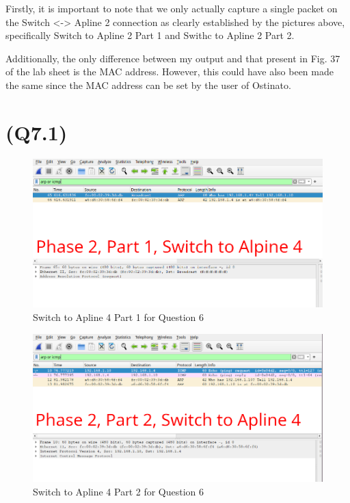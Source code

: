 Firstly, it is important to note that we only actually capture a single
packet on the Switch \textless-\textgreater{} Apline 2 connection as
clearly established by the pictures above, specifically Switch to Apline
2 Part 1 and Swithc to Apline 2 Part 2.

Additionally, the only difference between my output and that present in
Fig. 37 of the lab sheet is the MAC address. However, this could have
also been made the same since the MAC address can be set by the user of
Ostinato.

\hypertarget{q7.1}{%
\section{(Q7.1)}\label{q7.1}}

\begin{figure}
\centering
\includegraphics{data/q6-phase2-switch-to-alpine4-part1.png}
\caption{Switch to Apline 4 Part 1 for Question 6}
\end{figure}

\begin{figure}
\centering
\includegraphics{data/q6-phase2-switch-to-alpine4-part2.png}
\caption{Switch to Apline 4 Part 2 for Question 6}
\end{figure}

